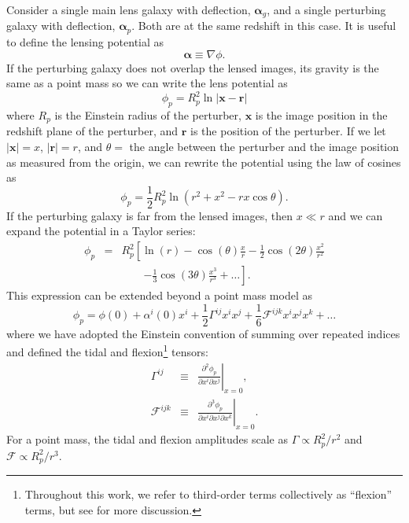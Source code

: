 \documentclass{emulateapj}
\newcommand\x[0]{\mathbf{x}}
\renewcommand\vec[1]{\mathbf{#1}}
\newcommand\al[0]{\boldsymbol{\alpha}}
\newcommand\sF{{\mathcal F}}
\begin{document}
Consider a single main lens galaxy with deflection, $\al_{g}$, and a single perturbing galaxy with deflection, $\al_p$. Both are at the same redshift in this case. It is useful to define the lensing potential as
\begin{equation}
\al \equiv \nabla \phi.
\end{equation}
If the perturbing galaxy does not overlap the lensed images, its gravity is the same as a point mass so we can write the lens potential as
\begin{equation}
\phi_p = R_p^2 \ln \left| \x - \vec{r} \right| 
\end{equation}
where $R_p$ is the Einstein radius of the perturber, $\x$ is the image position in the redshift plane of the perturber, and $\vec{r}$ is the position of the perturber. If we let $|\x| = x$, $|\vec{r}| = r$, and $\theta=$ the angle between the perturber and the image position as measured from the origin, we can rewrite the potential using the law of cosines as
\begin{equation}
\phi_p = \frac{1}{2}R_p^2 \ln(r^2 + x^2 - r x \cos\theta).
\end{equation}
If the perturbing galaxy is far from the lensed images, then $x \ll r$ and we can expand the potential in a Taylor series:
\begin{eqnarray}
\phi_p &=& R_p^2 \left[ \ln(r) - \cos(\theta) \frac{x}{r}  - \frac{1}{2} \cos(2\theta) \frac{x^2}{r^2} \right. \nonumber\\
&& \qquad\left. - \frac{1}{3}\cos(3\theta)\frac{x^3}{r^3}  + \ldots\right].
\end{eqnarray}
This expression can be extended beyond a point mass model as
\begin{equation}
\phi_p = \phi(0) + \alpha^i(0) x^i + \frac{1}{2}\Gamma^{ij} x^i x^j+ \frac{1}{6} \sF^{ijk} x^i x^j x^k + \ldots 
\end{equation}
where we have adopted the Einstein convention of summing over repeated indices and defined the tidal and flexion\footnote{Throughout this work, we refer to  third-order terms collectively as ``flexion'' terms, but see \citet{Bacon06} for more discussion.} tensors:
\begin{eqnarray}
\Gamma^{ij} &\equiv& \left. \frac{\partial^2 \phi_p}{\partial x^i \partial x^j} \right|_{x=0} , \\
\sF^{ijk} &\equiv&  \left. \frac{\partial^3 \phi_p}{\partial x^i \partial x^j \partial x^k} \right|_{x=0} .
\end{eqnarray}
For a point mass, the tidal and flexion amplitudes scale as $\Gamma \propto R_p^2/r^2$ and $\sF \propto R_p^2/r^3$.
\end{document}
